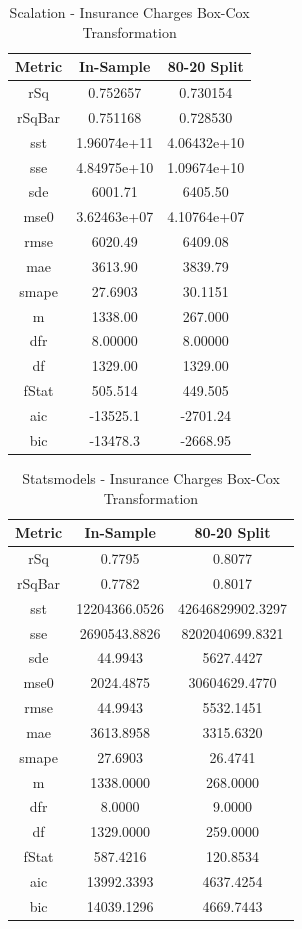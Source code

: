\documentclass{article}
\begin{document}
\begin{table}[H]
\centering
\caption{Scalation - Insurance Charges Box-Cox Transformation}
\label{tab:Scalation - Insurance Charges Box-Cox Transformation}
\begin{tabular}{|c|c|c|} \hline 
Metric & In-Sample & 80-20 Split \\ \hline \hline 
rSq &0.752657 & 0.730154 \\ \hline 
rSqBar &0.751168 &      0.728530 \\ \hline 
sst &1.96074e+11 &      4.06432e+10 \\ \hline 
sse &4.84975e+10 &      1.09674e+10 \\ \hline 
sde &6001.71 &  6405.50 \\ \hline 
mse0 &3.62463e+07 &     4.10764e+07 \\ \hline 
rmse &6020.49 & 6409.08 \\ \hline 
mae &3613.90 &  3839.79 \\ \hline 
smape &27.6903 &        30.1151 \\ \hline 
m &1338.00 &    267.000 \\ \hline 
dfr &8.00000 &  8.00000 \\ \hline 
df &1329.00 &   1329.00 \\ \hline 
fStat &505.514 &        449.505 \\ \hline 
aic &-13525.1 & -2701.24 \\ \hline 
bic &-13478.3 & -2668.95 \\ \hline 
\end{tabular}
\end{table}

\begin{table}[H]
\centering
\caption{Statsmodels - Insurance Charges Box-Cox Transformation}
\label{tab:Statsmodels - Insurance Charges Box-Cox Transformation}
\begin{tabular}{|c|c|c|}\hline
Metric & In-Sample & 80-20 Split \\ \hline \hline
rSq & 0.7795 & 0.8077 \\ \hline
rSqBar & 0.7782 & 0.8017 \\ \hline
sst & 12204366.0526 & 42646829902.3297 \\ \hline
sse & 2690543.8826 & 8202040699.8321 \\ \hline
sde & 44.9943 & 5627.4427 \\ \hline
mse0 & 2024.4875 & 30604629.4770 \\ \hline
rmse & 44.9943 & 5532.1451 \\ \hline
mae & 3613.8958 & 3315.6320 \\ \hline
smape & 27.6903 & 26.4741 \\ \hline
m & 1338.0000 & 268.0000 \\ \hline
dfr & 8.0000 & 9.0000 \\ \hline
df & 1329.0000 & 259.0000 \\ \hline
fStat & 587.4216 & 120.8534 \\ \hline
aic & 13992.3393 & 4637.4254 \\ \hline
bic & 14039.1296 & 4669.7443 \\ \hline
\end{tabular}
\end{table}
\end{document}
